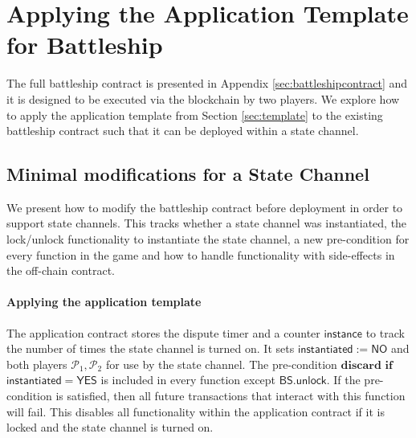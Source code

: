 \documentclass{llncs}
\newcommand{\instantiated}{\mathsf{instantiated}}
\newcommand{\instantiatedno}{\mathsf{NO}}
\newcommand{\instantiatedyes}{\mathsf{YES}}
\newcommand{\participant}{\mathcal{P}}
\newcommand{\battleshipunlock}{\mathsf{BS.unlock}}
\begin{document}
	\section{Applying the Application Template for Battleship} 

	The full battleship contract is presented in Appendix \ref{sec:battleshipcontract} and it is designed to be executed via the blockchain by two players. 
 	We explore how to apply the application template from Section \ref{sec:template} to the existing battleship contract such that it can be deployed within a state channel. 
	
	
	\subsection{Minimal modifications for a State Channel}
	
	We present how to modify the battleship contract before deployment in order to support state channels.
	This tracks whether a state channel was instantiated,  the lock/unlock functionality to instantiate the state channel, a new pre-condition for every function in the game and how to handle functionality with side-effects in the off-chain contract. 
	
	\paragraph{Applying the application template}
	The application contract stores the dispute timer and a counter $\mathsf{instance}$ to track the number of times the state channel is turned on. 
	It sets $\instantiated := \instantiatedno$ and both players $\participant_{1},\participant_{2}$ for use by the state channel.
	The pre-condition $\textbf{discard if}$ $ \instantiated  = \instantiatedyes$ is included in every function except $\battleshipunlock$. 
	If the pre-condition is satisfied, then all future transactions that interact with this function will fail.
	This disables all functionality within the application contract if it is locked and the state channel is turned on. 
	
\end{document}
